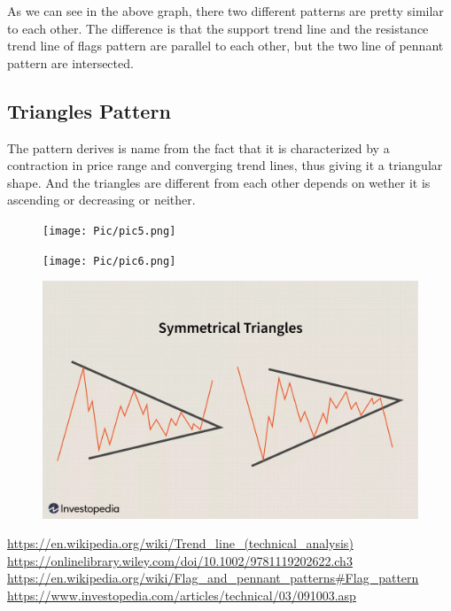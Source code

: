 \documentclass[conference]{IEEEtran}
\begin{document}
As we can see in the above graph, there two different patterns are pretty similar to each
other. The difference is that the support trend line and the resistance trend line of flags
pattern are parallel to each other, but the two line of pennant pattern are intersected.

\subsection*{Triangles Pattern}
The pattern derives is name from the fact that it is characterized by a contraction in 
price range and converging trend lines, thus giving it a triangular shape. And the 
triangles are different from each other depends on wether it is ascending or decreasing or neither.

\begin{figure}[H]
    \centerline{\texttt{[image: Pic/pic5.png]}}
\end{figure}

\begin{figure}[H]
    \centerline{\texttt{[image: Pic/pic6.png]}}
\end{figure}

\begin{figure}[H]
    \centerline{\includegraphics[scale=0.15]{Pic/pic7.png}}
\end{figure}


\begin{thebibliography}{00}
 \url{https://en.wikipedia.org/wiki/Trend_line_(technical_analysis)}
 \url{https://onlinelibrary.wiley.com/doi/10.1002/9781119202622.ch3}
 \url{https://en.wikipedia.org/wiki/Flag_and_pennant_patterns#Flag_pattern}
 \url{https://www.investopedia.com/articles/technical/03/091003.asp}
\end{thebibliography}
\end{document}
